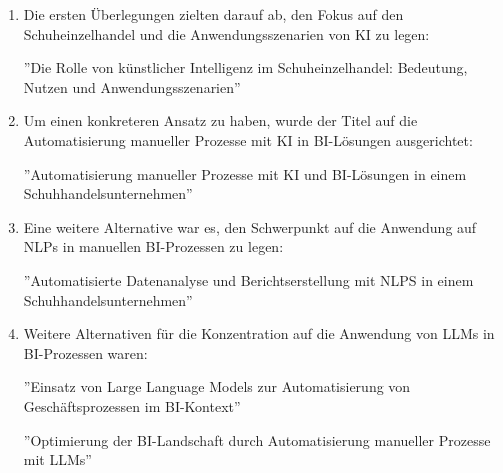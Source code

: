 \begin{enumerate}
    \item Die ersten Überlegungen zielten darauf ab, den Fokus auf den Schuheinzelhandel und die Anwendungsszenarien von KI zu legen:
    
    ''Die Rolle von künstlicher Intelligenz im Schuheinzelhandel: Bedeutung, Nutzen und Anwendungsszenarien''

    \item Um einen konkreteren Ansatz zu haben, wurde der Titel auf die Automatisierung manueller Prozesse mit KI in BI-Lösungen ausgerichtet:
    
    ''Automatisierung manueller Prozesse mit KI und BI-Lösungen in einem Schuhhandelsunternehmen''

    \item Eine weitere Alternative war es, den Schwerpunkt auf die Anwendung auf NLPs in manuellen BI-Prozessen zu legen:
    
    ''Automatisierte Datenanalyse und Berichtserstellung mit NLPS in einem Schuhhandelsunternehmen''

    \item Weitere Alternativen für die Konzentration auf die Anwendung von LLMs in BI-Prozessen waren:
    
    ''Einsatz von Large Language Models zur Automatisierung von Geschäftsprozessen im BI-Kontext''

    ''Optimierung der BI-Landschaft durch Automatisierung manueller Prozesse mit LLMs''
\end{enumerate}

\clearpage